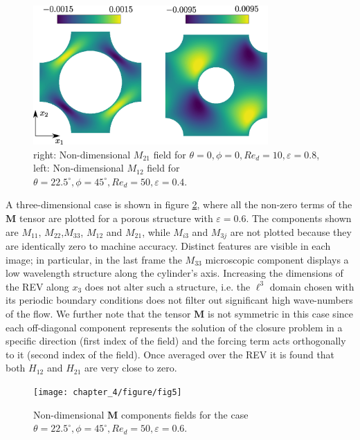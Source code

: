 \begin{figure}[H]
	\centering
	\includegraphics[width=0.8\textwidth]{chapter_4/figure/fig3}
	\caption{right: Non-dimensional $M_{21}$ field for $\theta=0, \phi=0, Re_d=10, \varepsilon=0.8$, left: Non-dimensional $M_{12}$ field for $\theta=22.5^{\circ}, \phi=45^{\circ}, Re_d=50, \varepsilon=0.4$.}
	\label{fig:3ch4}
\end{figure}

A three-dimensional case is shown in  figure \ref{fig:5ch4}, where all the non-zero terms of the $\mathbf{M}$ tensor are plotted for a porous
structure with $\varepsilon=0.6$. The components shown are $M_{11}$, $M_{22}$,$M_{33}$, $M_{12}$ and $M_{21}$, while $M_{i3}$ and $M_{3j}$ are 
not plotted because they are identically zero to machine accuracy. Distinct features are visible in each image; in particular, in the last 
frame the $M_{33}$ microscopic component displays a low wavelength structure along the cylinder's axis. Increasing the dimensions of the REV 
along $x_3$ does not alter such a structure, i.e. the $\ell^3$ domain chosen with its periodic boundary conditions does not filter out 
significant high wave-numbers of the flow. We further note that the tensor $\mathbf{M}$ is not symmetric in this case since each off-diagonal component 
represents the solution of the closure problem in a specific direction (first index of the field) and the forcing term acts orthogonally to it
(second index of the field).  Once averaged over the REV it is found that both $H_{12}$ and $H_{21}$ are very close to zero.  


\begin{figure}[H]
	\centering
	\texttt{[image: chapter\_4/figure/fig5]}
	\caption{Non-dimensional $\mathbf{M}$ components fields for the case $\theta=22.5^{\circ}, \phi=45^{\circ}, Re_d=50, \varepsilon=0.6$.}
	\label{fig:5ch4}
\end{figure}    



